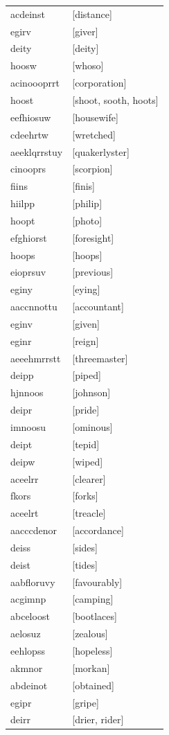 \documentclass{article}
\begin{document}
\begin{tabular}{ll}
acdeinst & [distance] \\
egirv & [giver] \\
deity & [deity] \\
hoosw & [whoso] \\
acinoooprrt & [corporation] \\
hoost & [shoot, sooth, hoots] \\
eefhiosuw & [housewife] \\
cdeehrtw & [wretched] \\
aeeklqrrstuy & [quakerlyster] \\
cinooprs & [scorpion] \\
fiins & [finis] \\
hiilpp & [philip] \\
hoopt & [photo] \\
efghiorst & [foresight] \\
hoops & [hoops] \\
eioprsuv & [previous] \\
eginy & [eying] \\
aaccnnottu & [accountant] \\
eginv & [given] \\
eginr & [reign] \\
aeeehmrrstt & [threemaster] \\
deipp & [piped] \\
hjnnoos & [johnson] \\
deipr & [pride] \\
imnoosu & [ominous] \\
deipt & [tepid] \\
deipw & [wiped] \\
aceelrr & [clearer] \\
fkors & [forks] \\
aceelrt & [treacle] \\
aacccdenor & [accordance] \\
deiss & [sides] \\
deist & [tides] \\
aabfloruvy & [favourably] \\
acgimnp & [camping] \\
abceloost & [bootlaces] \\
aelosuz & [zealous] \\
eehlopss & [hopeless] \\
akmnor & [morkan] \\
abdeinot & [obtained] \\
egipr & [gripe] \\
deirr & [drier, rider] \\

\end{tabular}
\end{document}
